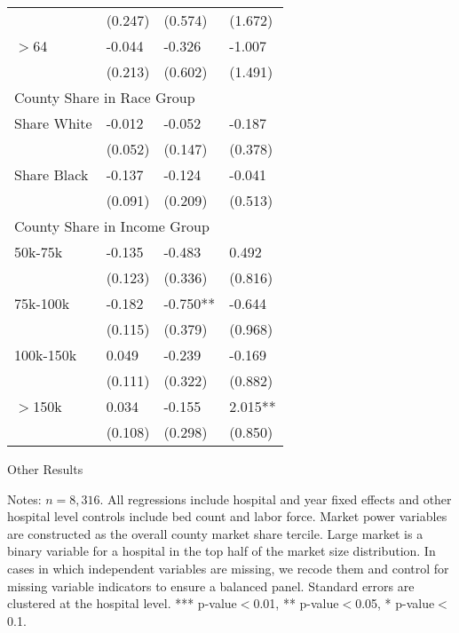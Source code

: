 \documentclass[12pt]{article}
\begin{document}
{\begin{tabular}{llll}
		&	(0.247)	&	(0.574)	&	(1.672)	\\
\hspace{0.1in} $>$64		&	-0.044	&	-0.326	&	-1.007	\\
		&	(0.213)	&	(0.602)	&	(1.491)	\\
\hline																		
\multicolumn{4}{l}{County Share in Race Group}\\																		
\hspace{0.1in} Share White		&	-0.012	&	-0.052	&	-0.187	\\
		&	(0.052)	&	(0.147)	&	(0.378)	\\
\hspace{0.1in} Share Black		&	-0.137	&	-0.124	&	-0.041	\\
		&	(0.091)	&	(0.209)	&	(0.513)	\\
\hline																		
\multicolumn{4}{l}{County Share in Income Group}\\																
\hspace{0.1in} 50k-75k		&	-0.135	&	-0.483	&	0.492	\\
		&	(0.123)	&	(0.336)	&	(0.816)	\\
\hspace{0.1in} 75k-100k		&	-0.182	&	-0.750**	&	-0.644	\\
		&	(0.115)	&	(0.379)	&	(0.968)	\\
\hspace{0.1in} 100k-150k		&	0.049	&	-0.239	&	-0.169	\\
		&	(0.111)	&	(0.322)	&	(0.882)	\\
\hspace{0.1in}$>$150k		&	0.034	&	-0.155	&	2.015**	\\
		&	(0.108)	&	(0.298)	&	(0.850)	\\
\hline
\end{tabular}
}
\setlength{\captionmargin}{.5 \textwidth} \addtolength{\captionmargin}{-.5\wd\gfxbox}
\begin{table}[!h]
\centering
\caption{Other Results}
\label{tab:other_results}
\usebox{\gfxbox}
\par
\begin{minipage}{\wd\gfxbox}
\footnotesize
Notes: $n=8,316$.  All regressions include hospital and year fixed effects and other hospital level controls include bed count and labor force.  Market power variables are constructed as the overall county market share tercile.  Large market is a binary variable for a hospital in the top half of the market size distribution.  In cases in which independent variables are missing, we recode them and control for missing variable indicators to ensure a balanced panel.  Standard errors are clustered at the hospital level.  *** p-value$<$0.01, ** p-value$<$0.05, * p-value$<$0.1.
\end{minipage}
\end{table}
\end{document}
